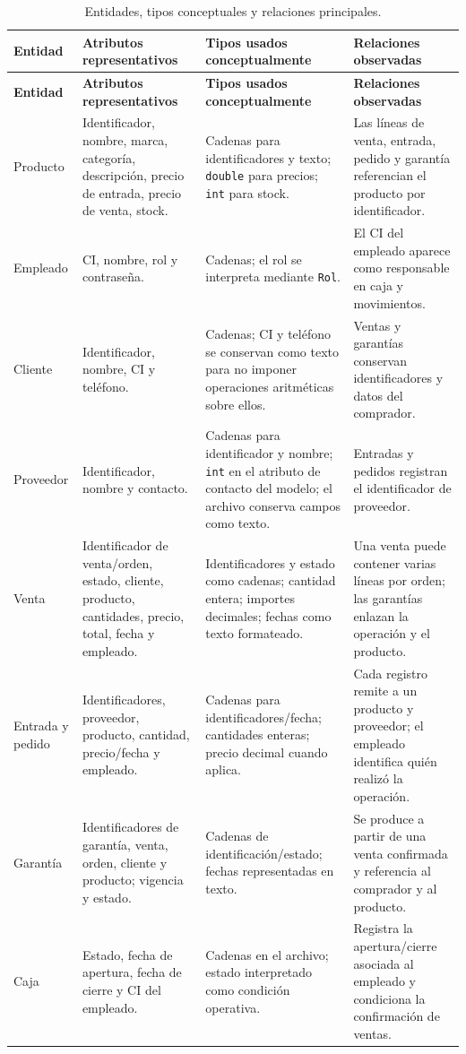 \begin{longtable}{|p{2.4cm}|p{3.2cm}|p{3.1cm}|p{3.9cm}|}
\caption{Entidades, tipos conceptuales y relaciones principales.}
\label{tab:entidades}\\
\hline
\textbf{Entidad} & \textbf{Atributos representativos} & \textbf{Tipos usados conceptualmente} & \textbf{Relaciones observadas}\\
\hline
\endfirsthead
\hline
\textbf{Entidad} & \textbf{Atributos representativos} & \textbf{Tipos usados conceptualmente} & \textbf{Relaciones observadas}\\
\hline
\endhead
Producto & Identificador, nombre, marca, categoría, descripción, precio de entrada, precio de venta, stock. & Cadenas para identificadores y texto; \texttt{double} para precios; \texttt{int} para stock. & Las líneas de venta, entrada, pedido y garantía referencian el producto por identificador.\\
\hline
Empleado & CI, nombre, rol y contraseña. & Cadenas; el rol se interpreta mediante \texttt{Rol}. & El CI del empleado aparece como responsable en caja y movimientos.\\
\hline
Cliente & Identificador, nombre, CI y teléfono. & Cadenas; CI y teléfono se conservan como texto para no imponer operaciones aritméticas sobre ellos. & Ventas y garantías conservan identificadores y datos del comprador.\\
\hline
Proveedor & Identificador, nombre y contacto. & Cadenas para identificador y nombre; \texttt{int} en el atributo de contacto del modelo; el archivo conserva campos como texto. & Entradas y pedidos registran el identificador de proveedor.\\
\hline
Venta & Identificador de venta/orden, estado, cliente, producto, cantidades, precio, total, fecha y empleado. & Identificadores y estado como cadenas; cantidad entera; importes decimales; fechas como texto formateado. & Una venta puede contener varias líneas por orden; las garantías enlazan la operación y el producto.\\
\hline
Entrada y pedido & Identificadores, proveedor, producto, cantidad, precio/fecha y empleado. & Cadenas para identificadores/fecha; cantidades enteras; precio decimal cuando aplica. & Cada registro remite a un producto y proveedor; el empleado identifica quién realizó la operación.\\
\hline
Garantía & Identificadores de garantía, venta, orden, cliente y producto; vigencia y estado. & Cadenas de identificación/estado; fechas representadas en texto. & Se produce a partir de una venta confirmada y referencia al comprador y al producto.\\
\hline
Caja & Estado, fecha de apertura, fecha de cierre y CI del empleado. & Cadenas en el archivo; estado interpretado como condición operativa. & Registra la apertura/cierre asociada al empleado y condiciona la confirmación de ventas.\\
\hline
\end{longtable}

